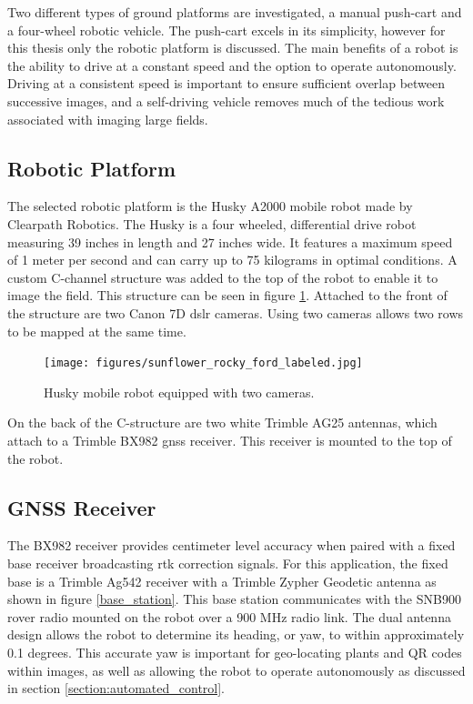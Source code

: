 Two different types of ground platforms are investigated, a manual push-cart and a four-wheel robotic vehicle.  The push-cart excels in its simplicity, however for this thesis only the robotic platform is discussed.  The main benefits of a robot is the ability to drive at a constant speed and the option to operate autonomously.  Driving at a consistent speed is important to ensure sufficient overlap between successive images, and a self-driving vehicle removes much of the tedious work associated with imaging large fields.  

\subsection{Robotic Platform}

The selected robotic platform is the Husky A2000 mobile robot made by Clearpath Robotics.  The Husky is a four wheeled, differential drive robot measuring 39 inches in length and 27 inches wide.  It features a maximum speed of 1 meter per second and can carry up to 75 kilograms in optimal conditions.  A custom C-channel structure was added to the top of the robot to enable it to image the field.  This structure can be seen in figure \ref{husky_rocky_ford}.  Attached to the front of the structure are two Canon 7D \ac{dslr} cameras.  Using two cameras allows two rows to be mapped at the same time. 

\begin{figure}
	\centering
    \texttt{[image: figures/sunflower\_rocky\_ford\_labeled.jpg]}
    \caption[Husky robot]{Husky mobile robot equipped with two cameras.}
    \label{husky_rocky_ford}
\end{figure}

On the back of the C-structure are two white Trimble AG25 antennas, which attach to a Trimble BX982 \ac{gnss} receiver.  This receiver is mounted to the top of the robot.

\subsection{GNSS Receiver}

The BX982 receiver provides centimeter level accuracy when paired with a fixed base receiver broadcasting \ac{rtk} correction signals.  For this application, the fixed base is a Trimble Ag542 receiver with a Trimble Zypher Geodetic antenna as shown in figure \ref{base_station}.  This base station communicates with the SNB900 rover radio mounted on the robot over a 900 MHz radio link.   The dual antenna design allows the robot to determine its heading, or yaw, to within approximately 0.1 degrees.  This accurate yaw is important for geo-locating plants and QR codes within images, as well as allowing the robot to operate autonomously as discussed in section \ref{section:automated_control}. 

